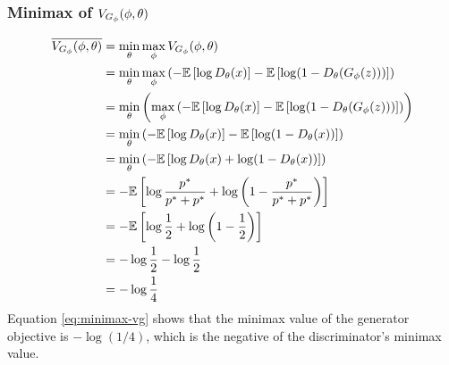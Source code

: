 \subsubsection{Minimax of $V_{G_\phi}(\phi, \theta)$}
\label{sec:minimax-vg}
\begin{align}
	\overline{V_{G_\phi}(\phi, \theta)} & = \min_{\theta}\max_{\phi} V_{G_\phi}(\phi, \theta) \nonumber                                                                                                           \\
	               & = \min_{\theta}\max_{\phi} \left( -\mathbb{E}\left[\log{D_\theta(x)}\right] - \mathbb{E}\left[\log(1 - D_\theta(G_\phi(z)))\right] \right) \nonumber               \\
	               & = \min_{\theta}\left(\max_{\phi} \left( -\mathbb{E}\left[\log{D_\theta(x)}\right] - \mathbb{E}\left[\log(1 - D_\theta(G_\phi(z)))\right] \right) \right) \nonumber \\
	               & = \min_{\theta}\left( -\mathbb{E}\left[\log{D_\theta(x)}\right] - \mathbb{E}\left[\log(1 - D_\theta(x))\right] \right) \nonumber                               \\
	               & = \min_{\theta}\left( -\mathbb{E}\left[\log{D_\theta(x)} + \log(1 - D_\theta(x))\right] \right) \nonumber                                                      \\
	               & = -\mathbb{E}\left[\log\frac{p^*}{p^* + p^*} + \log\left(1 - \frac{p^*}{p^* + p^*}\right) \right] \nonumber                                        \\
	               & = - \mathbb{E}\left[\log\frac{1}{2} + \log{\left(1 - \frac{1}{2}\right)}\right] \nonumber                                                          \\
	               & = - \log\frac{1}{2} - \log\frac{1}{2} \nonumber                                                                                                    \\
	               & = - \log\frac{1}{4} \label{eq:minimax-vg}
\end{align}
Equation \ref{eq:minimax-vg} shows that the minimax value of the generator
objective is $-\log(1/4)$, which is the negative of the discriminator's minimax
value.
